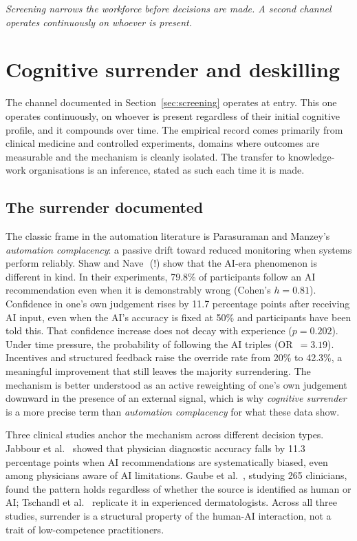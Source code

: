 \documentclass[11pt,a4paper]{article}
\newcommand{\bridgeskip}{\vspace{6pt}}
\begin{document}
\bridgeskip
\noindent\textit{Screening narrows the workforce before decisions are made.
A second channel operates continuously on whoever is present.}

\section{Cognitive surrender and deskilling}\label{sec:surrender}

The channel documented in Section~\ref{sec:screening} operates at entry.
This one operates continuously, on whoever is present regardless of their
initial cognitive profile, and it compounds over time. The empirical record
comes primarily from clinical medicine and controlled experiments, domains
where outcomes are measurable and the mechanism is cleanly isolated. The
transfer to knowledge-work organisations is an inference, stated as such
each time it is made.

\subsection{The surrender documented}

The classic frame in the automation literature is Parasuraman and Manzey's
\cite{parasuraman_humafact_2010} \textit{automation complacency}: a passive
drift toward reduced monitoring when systems perform reliably. Shaw and
Nave~\cite{shaw_psyarxiv_2026}\,(!) show that the AI-era phenomenon is
different in kind. In their experiments, 79.8\% of participants follow an AI
recommendation even when it is demonstrably wrong (Cohen's $h = 0.81$).
Confidence in one's own judgement rises by 11.7 percentage points after
receiving AI input, even when the AI's accuracy is fixed at 50\% and
participants have been told this. That confidence increase does not decay
with experience ($p = 0.202$). Under time pressure, the probability of
following the AI triples (OR~$= 3.19$). Incentives and structured feedback
raise the override rate from 20\% to 42.3\%, a meaningful improvement that
still leaves the majority surrendering. The mechanism is better understood
as an active reweighting of one's own judgement downward in the presence of
an external signal, which is why \textit{cognitive surrender} is a more
precise term than \textit{automation complacency} for what these data show.

Three clinical studies anchor the mechanism across different decision types.
Jabbour et al.~\cite{jabbour_jama_2023} showed that physician diagnostic
accuracy falls by 11.3 percentage points when AI recommendations are
systematically biased, even among physicians aware of AI limitations. Gaube
et al.~\cite{gaube_npjdm_2021}, studying 265 clinicians, found the pattern
holds regardless of whether the source is identified as human or AI;
Tschandl et al.~\cite{tschandl_natmed_2020} replicate it in experienced
dermatologists. Across all three studies, surrender is a structural property
of the human-AI interaction, not a trait of low-competence practitioners.
\end{document}
